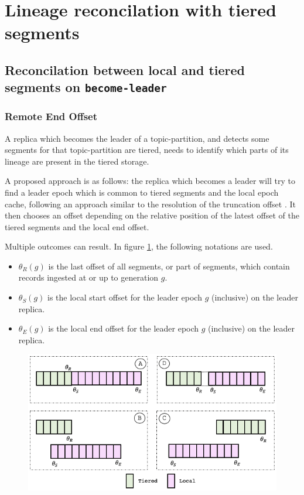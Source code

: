\documentclass{article}
\begin{document}
\newpage
\section{Lineage reconcilation with tiered segments}

\subsection{Reconcilation between local and tiered segments on \texttt{become-leader}}

\subsubsection{Remote End Offset}

A replica which becomes the leader of a topic-partition, and detects some segments for that topic-partition are tiered, needs to identify which parts of its lineage are present in the tiered storage. 

A proposed approach is as follows: the replica which becomes a leader will try to find a leader epoch which is common to tiered segments and the local epoch cache, following an approach similar to the resolution of the truncation offset \cite{KIP279}. It then chooses an offset depending on the relative position of the latest offset of the tiered segments and the local end offset.

Multiple outcomes can result. In figure \ref{fig:become-leader}, the following notations are used.

\begin{itemize}
	\item $\theta_R(g)$ is the last offset of all segments, or part of segments, which contain records ingested at or up to generation $g$.
	\item $\theta_S(g)$ is the local start offset for the leader epoch $g$ (inclusive) on the leader replica.
	\item $\theta_E(g)$ is the local end offset for the leader epoch $g$ (inclusive) on the leader replica.
\end{itemize} 

\begin{figure}[h!]
	\centering
	\includegraphics[scale=0.65]{become-leader.png}
	\label{fig:become-leader}
\end{figure}
\end{document}
